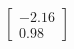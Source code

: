 \documentclass[preview]{standalone}
\begin{document}
\begin{align*}
\begin{bmatrix} -2.16 \\ 0.98 \end{bmatrix}
\end{align*}
\end{document}
